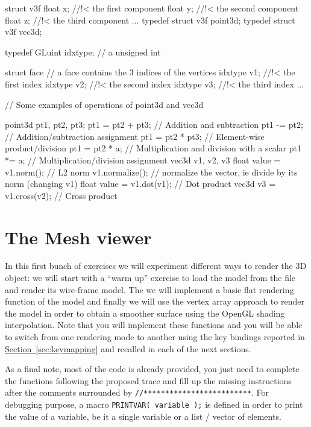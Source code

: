 \documentclass[a4paper,11pt]{article}
\newcommand{\hilight}[1]{\colorbox{bg}{#1}}
\newcommand{\code}[1]{\hilight{\texttt{#1}}}
\newcommand{\brand}[1]{\textsf{#1}\xspace}
\newcommand{\opengl}{\brand{OpenGL}}
\newcommand{\sect}[1]{\hyperref[#1]{\mbox{Section \ref*{#1}}}\xspace}
\begin{document}
{\smaller
\begin{cppcode}
struct v3f
{
    float x; //!< the first component
    float y; //!< the second component
    float z; //!< the third component
...
}
typedef struct v3f point3d;
typedef struct v3f vec3d;

typedef GLuint idxtype;     // a unsigned int

struct face // a face contains the 3 indices of the vertices
{
    idxtype v1; //!< the first index
    idxtype v2; //!< the second index
    idxtype v3; //!< the third index
...
}

// Some examples of operations of point3d and vec3d

point3d pt1, pt2, pt3;
pt1 = pt2 + pt3;           // Addition and subtraction
pt1 -= pt2;                // Addition/subtraction assignment
pt1 = pt2 * pt3;           // Element-wise product/division
pt1 = pt2 * a;             // Multiplication and division with a scalar
pt1 *= a;                  // Multiplication/division assignment
vec3d v1, v2, v3
float value = v1.norm();   // L2 norm
v1.normalize();            // normalize the vector, ie divide by its norm (changing v1)
float value = v1.dot(v1);  // Dot product
vec3d v3 = v1.cross(v2);   // Cross product
\end{cppcode}
}




\section{The Mesh viewer}

In this first bunch of exercises we will experiment different ways to render the 3D object: we will start with a \enquote{warm up} exercise to load the model from the file and render its wire-frame model. The we will implement a basic flat rendering function of the model and finally we will use the vertex array approach to render the model in order to obtain a smoother surface using the \opengl shading interpolation. Note that you will implement these functions and you will be able to switch from one rendering mode to another using the key bindings reported in \sect{sec:keymapping} and recalled in each of the next sections.

As a final note, most of the code is already provided, you just need to complete the functions following the proposed trace and fill up the missing instructions after the comments surrounded by \code{//*************************}. For debugging purpose, a macro \code{PRINTVAR( variable );} is defined in order to print the value of a variable, be it a single variable or a list / vector of elements.
\end{document}
